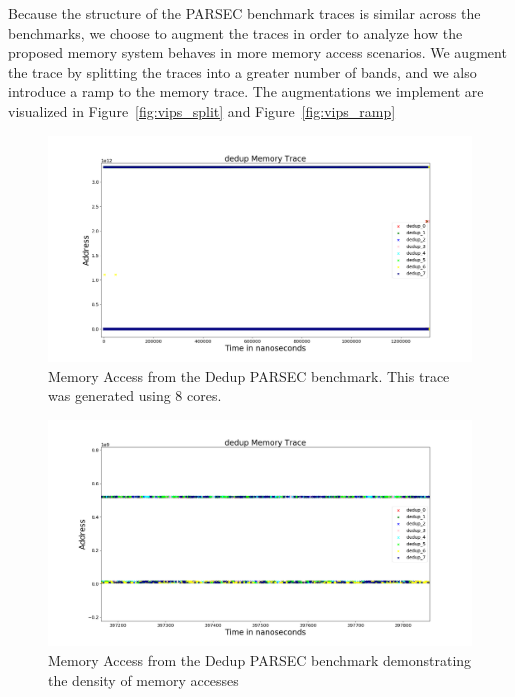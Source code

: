 Because the structure of the PARSEC benchmark traces is similar across the benchmarks, we choose to augment the traces in order to analyze how the proposed memory system behaves in more memory access scenarios. We augment the trace by splitting the traces into a greater number of bands, and we also introduce a ramp to the memory trace. The augmentations we implement are visualized in Figure~\ref{fig:vips_split} and Figure~\ref{fig:vips_ramp}


\begin{figure}[h!]

		\includegraphics[width=\linewidth]{figures/dedup_whole.png}
		\caption{Memory Access from the Dedup PARSEC benchmark. This trace was generated using 8 cores.}
		\label{fig:dedup_whole}
\end{figure}

\begin{figure}[h!]
		\includegraphics[width=\linewidth]{figures/dedup_dense.png}
		\caption{Memory Access from the Dedup PARSEC benchmark demonstrating the density of memory accesses}
		\label{fig:dedup_dense}
\end{figure}
		
